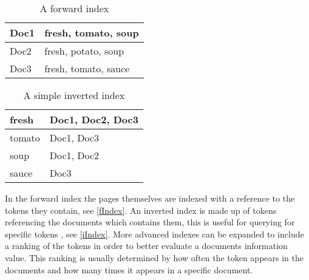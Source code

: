 \begin{minipage}{.40\textwidth}
  \centering
  \begin{table}[H]
	\centering
    \begin{tabular}{|l|l|}
\hline
Doc1 & fresh, tomato, soup \\ \hline
Doc2 & fresh, potato, soup \\ \hline
Doc3 & fresh, tomato, sauce \\ \hline
	\end{tabular}
	\caption{A forward index}
	\label{fIndex}
  \end{table}
\end{minipage}
\begin{minipage}{0.5\textwidth}
  \centering
  \begin{table}[H]
	\centering
    \begin{tabular}{|l|l|}
\hline
fresh & Doc1, Doc2, Doc3 \\ \hline
tomato & Doc1, Doc3 \\ \hline
soup & Doc1, Doc2 \\ \hline
sauce & Doc3 \\ \hline
	\end{tabular}
	\caption{A simple inverted index}
	\label{iIndex}
  \end{table}
\end{minipage}\nl

In the forward index the pages themselves are indexed with a reference to the
tokens they contain, see \autoref{fIndex}. An inverted index is made up of
tokens referencing the documents which contains them, this is useful for
querying for specific tokens \citep{Index3}, see \autoref{iIndex}. More advanced
indexes can be expanded to include a ranking of the tokens in order to better
evaluate a documents information value. This ranking is usually determined by
how often the token appears in the documents and how many times it appears in a
specific document.

